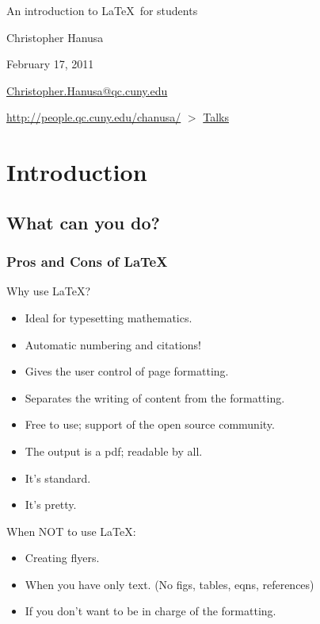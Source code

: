 \documentclass{beamer}  %
\newcommand{\bi}{\bigskip}  %
\begin{document}
\frame
{
\centering
{\color{black!30!blue!100} \Large An introduction to \LaTeX\ for students}

\bi
{\large Christopher Hanusa}

\bi
{\large February 17, 2011}

\bi
\url{Christopher.Hanusa@qc.cuny.edu}

\bi
\url{http://people.qc.cuny.edu/chanusa/} $>$ \url{Talks}


}

\section{Introduction}
\subsection{What can you do?}
\frame
{
  \frametitle{Pros and Cons of \LaTeX}

Why use \LaTeX?
\begin{itemize}
\item Ideal for typesetting mathematics.
\item Automatic numbering and citations!
\item Gives the user control of page formatting.
\item Separates the writing of content from the formatting.
\item Free to use; support of the open source community.
\item The output is a pdf; readable by all.
\item It's standard.
\item It's pretty.
\end{itemize}

\bi
When NOT to use \LaTeX:
\begin{itemize}
\item Creating flyers.
\item When you have only text. (No figs, tables, eqns, references)
\item If you don't want to be in charge of the formatting.
\end{itemize}

}
\end{document}
